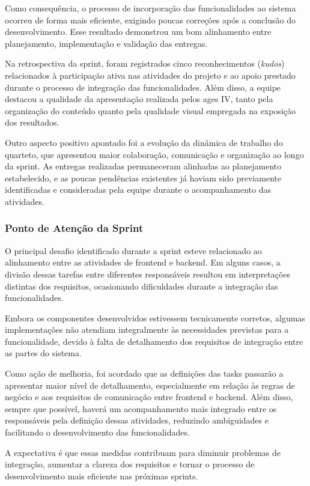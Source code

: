 Como consequência, o processo de incorporação das funcionalidades ao sistema ocorreu
de forma mais eficiente, exigindo poucas correções após a conclusão do
desenvolvimento. Esse resultado demonstrou um bom alinhamento entre planejamento,
implementação e validação das entregas.

Na retrospectiva da sprint, foram registrados cinco reconhecimentos (\textit{kudos})
relacionados à participação ativa nas atividades do projeto e ao apoio prestado durante
o processo de integração das funcionalidades. Além disso, a equipe destacou a qualidade
da apresentação realizada pelos \ac{ages} IV, tanto pela organização do conteúdo quanto
pela qualidade visual empregada na exposição dos resultados.

Outro aspecto positivo apontado foi a evolução da dinâmica de trabalho do quarteto,
que apresentou maior colaboração, comunicação e organização ao longo da sprint. As
entregas realizadas permaneceram alinhadas ao planejamento estabelecido, e as poucas
pendências existentes já haviam sido previamente identificadas e consideradas pela
equipe durante o acompanhamento das atividades.

\subsubsection*{Ponto de Atenção da Sprint}

O principal desafio identificado durante a sprint esteve relacionado ao alinhamento
entre as atividades de frontend e backend. Em alguns casos, a divisão dessas tarefas
entre diferentes responsáveis resultou em interpretações distintas dos requisitos,
ocasionando dificuldades durante a integração das funcionalidades.

Embora os componentes desenvolvidos estivessem tecnicamente corretos, algumas
implementações não atendiam integralmente às necessidades previstas para a
funcionalidade, devido à falta de detalhamento dos requisitos de integração entre as
partes do sistema.

Como ação de melhoria, foi acordado que as definições das tasks passarão a apresentar
maior nível de detalhamento, especialmente em relação às regras de negócio e aos
requisitos de comunicação entre frontend e backend. Além disso, sempre que possível,
haverá um acompanhamento mais integrado entre os responsáveis pela definição dessas
atividades, reduzindo ambiguidades e facilitando o desenvolvimento das funcionalidades.

A expectativa é que essas medidas contribuam para diminuir problemas de integração,
aumentar a clareza dos requisitos e tornar o processo de desenvolvimento mais eficiente
nas próximas sprints.
